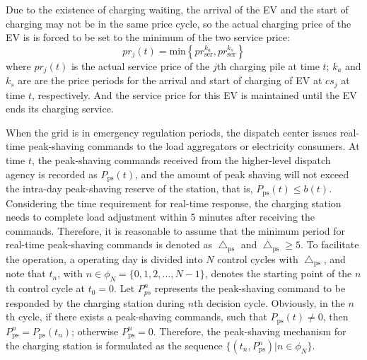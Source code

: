\documentclass[preprint,12pt]{elsarticle}
\begin{document}
Due to the existence of charging waiting, the arrival of the EV and the start of charging may not be in the same price cycle, so the actual charging price of the EV is is forced to be set to the minimum of the two service price:
\begin{equation}
pr_{j}(t)=\textrm{min}\left\{ pr_{\textrm{ser}}^{k_{a}},pr_{\textrm{ser}}^{k_{s}}\right\}
\end{equation}
where $pr_{j}(t)$ is the actual service price of the $j$th charging pile at time $t$; $k_{a}$ and $k_{s}$ are are the price periods
for the arrival and start of charging of EV at $cs_{j}$ at time $t$, respectively. And the service price for this EV is maintained until the EV ends its charging service.

When the grid is in emergency regulation periods, the dispatch center issues real-time peak-shaving commands to the load aggregators or electricity consumers. At time $t$, the peak-shaving commands received from the higher-level dispatch agency is recorded as $P_{\textrm{ps}}(t)$, and the amount of peak shaving will not exceed the intra-day peak-shaving reserve of the station, that is, $P_{\textrm{ps}}(t)\leq b(t)$. Considering the time requirement for real-time response, the charging station needs to complete load adjustment within 5 minutes after receiving the commands. Therefore, it is reasonable to assume that the minimum period for real-time peak-shaving commands is denoted as $\bigtriangleup_{\textrm{ps}}$ and $\bigtriangleup_{\textrm{ps}}\geq5$. To facilitate the operation, a operating day is divided into $N$ control cycles with $\bigtriangleup_{\textrm{ps}}$, and note that $t_{n}$, with $n\in\phi_{N}=\{0,1,2,\ldots,N-1\}$, denotes the starting point of the $n$th control cycle at $t_{0}=0$. Let $P_{ps}^{n}$ represents the peak-shaving command to be responded by the charging station during $n$th decision cycle. Obviously, in the $n$th cycle, if there exists a peak-shaving commands, such that $P_{\textrm{ps}}(t)\neq0$, then $P_{\textrm{ps}}^{n}=P_{\textrm{ps}}(t_{n})$; otherwise $P_{\textrm{ps}}^{n}=0$. Therefore, the peak-shaving mechanism for the charging station is formulated as the sequence $\{(t_{n},P_{\textrm{ps}}^{n})|n\in\phi_{N}\}$.
\end{document}
